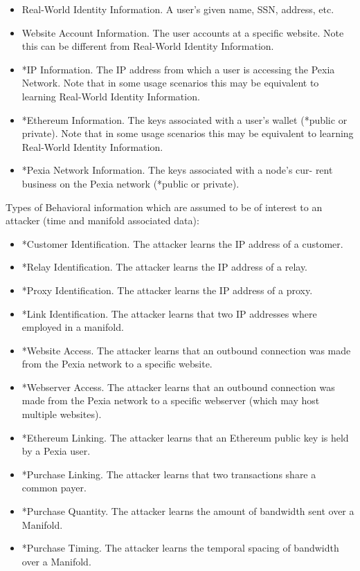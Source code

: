 \documentclass{article}
\newcommand{\mesh}{Pexia}
\begin{document}
\begin{itemize}
    \item Real-World Identity Information. A user’s given name, SSN, address, etc.
    \item Website Account Information. The user accounts at a specific website. Note this can be different from Real-World Identity Information.
    \item *IP Information. The IP address from which a user is accessing the \mesh{} Network. Note that in some usage scenarios this may be equivalent to learning Real-World Identity Information.
    \item *Ethereum Information. The keys associated with a user’s wallet (*public or private). Note that in some usage scenarios this may be equivalent to learning Real-World Identity Information.
    \item *\mesh{} Network Information. The keys associated with a node’s cur- rent business on the \mesh{} network (*public or private).
\end{itemize}

Types of Behavioral information which are assumed to be of interest to an attacker (time and manifold associated data):

\begin{itemize}
    \item *Customer Identification. The attacker learns the IP address of a customer.
    \item *Relay Identification. The attacker learns the IP address of a relay.
    \item *Proxy Identification. The attacker learns the IP address of a proxy.
    \item *Link Identification. The attacker learns that two IP addresses where employed in a manifold.
    \item *Website Access. The attacker learns that an outbound connection was made from the \mesh{} network to a specific website.
    \item *Webserver Access. The attacker learns that an outbound connection was made from the \mesh{} network to a specific webserver (which may host multiple websites).
    \item *Ethereum Linking. The attacker learns that an Ethereum public key is held by a \mesh{} user.
    \item *Purchase Linking. The attacker learns that two transactions share a common payer.
    \item *Purchase Quantity. The attacker learns the amount of bandwidth sent over a Manifold.
    \item *Purchase Timing. The attacker learns the temporal spacing of bandwidth over a Manifold.
\end{itemize}
\end{document}
